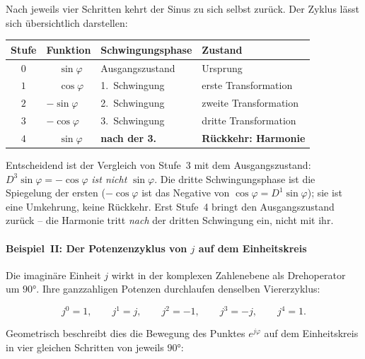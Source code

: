 ﻿\documentclass[a4paper,12pt]{article}
\theoremstyle{definition}
\begin{document}
Nach jeweils vier Schritten kehrt der Sinus zu sich selbst zurück. Der Zyklus
lässt sich übersichtlich darstellen:

\begin{center}
\begin{tabular}{clll}
	\toprule
	Stufe & Funktion & Schwingungsphase & Zustand \\
	\midrule
	$0$ & $\phantom{-}\sin\varphi$ & Ausgangszustand & Ursprung \\
	$1$ & $\phantom{-}\cos\varphi$ & 1.~Schwingung & erste Transformation \\
	$2$ & $-\sin\varphi$ & 2.~Schwingung & zweite Transformation \\
	$3$ & $-\cos\varphi$ & 3.~Schwingung & dritte Transformation \\
	$4$ & $\phantom{-}\sin\varphi$ & \textbf{nach der 3.} & \textbf{Rückkehr: Harmonie} \\
	\bottomrule
\end{tabular}
\end{center}

Entscheidend ist der Vergleich von Stufe~3 mit dem Ausgangszustand: $D^3\sin\varphi
= -\cos\varphi$ \textit{ist nicht} $\sin\varphi$. Die dritte Schwingungsphase ist die
Spiegelung der ersten ($-\cos\varphi$ ist das Negative von $\cos\varphi = D^1\sin\varphi$);
sie ist eine Umkehrung, keine Rückkehr. Erst Stufe~4 bringt den Ausgangszustand
zurück -- die Harmonie tritt \textit{nach} der dritten Schwingung ein, nicht mit ihr.

\paragraph{Beispiel~II: Der Potenzenzyklus von $j$ auf dem Einheitskreis}

Die imaginäre Einheit $j$ wirkt in der komplexen Zahlenebene als Drehoperator um
$90 °$. Ihre ganzzahligen Potenzen durchlaufen denselben Viererzyklus:

\begin{equation}
	j^0 = 1, \qquad j^1 = j, \qquad j^2 = -1, \qquad j^3 = -j, \qquad j^4 = 1.
\end{equation}

Geometrisch beschreibt dies die Bewegung des Punktes $e^{j\varphi}$ auf dem
Einheitskreis in vier gleichen Schritten von jeweils $90 °$:
\end{document}
